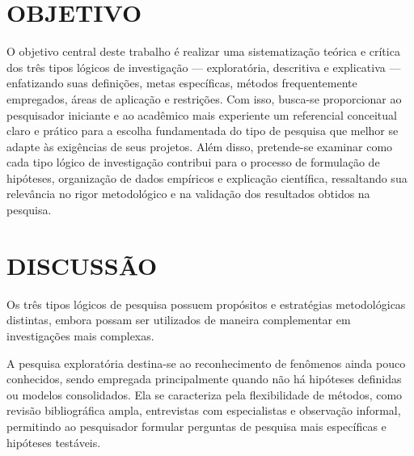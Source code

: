 
\section{\esp OBJETIVO}

O objetivo central deste trabalho é realizar uma sistematização teórica e crítica dos três tipos lógicos de investigação — exploratória, descritiva e explicativa — enfatizando suas definições, metas específicas, métodos frequentemente empregados, áreas de aplicação e restrições. Com isso, busca-se proporcionar ao pesquisador iniciante e ao acadêmico mais experiente um referencial conceitual claro e prático para a escolha fundamentada do tipo de pesquisa que melhor se adapte às exigências de seus projetos. Além disso, pretende-se examinar como cada tipo lógico de investigação contribui para o processo de formulação de hipóteses, organização de dados empíricos e explicação científica, ressaltando sua relevância no rigor metodológico e na validação dos resultados obtidos na pesquisa.

\section{\esp DISCUSSÃO}

Os três tipos lógicos de pesquisa possuem propósitos e estratégias metodológicas distintas, embora possam ser utilizados de maneira complementar em investigações mais complexas.

A pesquisa exploratória destina-se ao reconhecimento de fenômenos ainda pouco conhecidos, sendo empregada principalmente quando não há hipóteses definidas ou modelos consolidados. Ela se caracteriza pela flexibilidade de métodos, como revisão bibliográfica ampla, entrevistas com especialistas e observação informal, permitindo ao pesquisador formular perguntas de pesquisa mais específicas e hipóteses testáveis.


